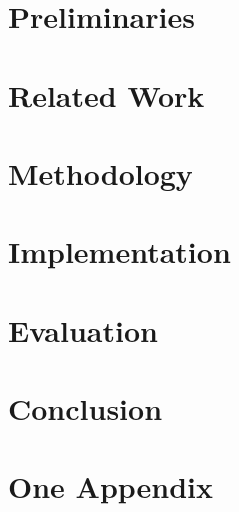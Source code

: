 \documentclass[12pt,a4paper,oneside]{book}
\begin{document}
\chapter{Preliminaries}\label{chapter:preliminaries}


\chapter{Related Work}\label{chapter:relatedWork}


\chapter{Methodology}\label{chapter:methodology}


\chapter{Implementation}\label{chapter:implementation}


\chapter{Evaluation}\label{chapter:evaluation}


\chapter{Conclusion}\label{chapter:conclusion}





\appendix 
{}

\chapter{One Appendix}\label{chapter:oneappendix}
\end{document}
